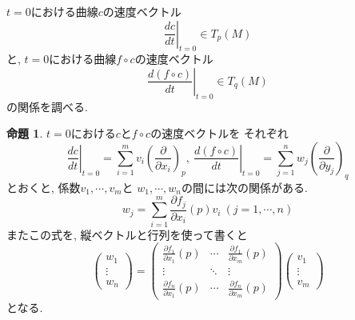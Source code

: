 \documentclass[a4j,12pt]{jarticle}
\theoremstyle{definition}
\newtheorem{proposition}[theorem]{命題}
\begin{document}
$t=0$における曲線$c$の速度ベクトル
$$\left .\frac{dc}{dt}\right|_{t=0}\in T_p(M)$$
と, $t=0$における曲線$f\circ c$の速度ベクトル
$$\left .\frac{d(f\circ c)}{dt}\right|_{t=0}
\in T_q(M)$$
の関係を調べる. 
\begin{proposition}\label{prop:relation of v and w}
    $t=0$における$c$と$f\circ c$の速度ベクトルを
    それぞれ
    $$\left .\frac{dc}{dt}\right|_{t=0}=
    \sum_{i=1}^{m}v_i\left(\frac{\partial}
    {\partial x_i}\right)_p,\ 
    \left .\frac{d(f\circ c)}{dt}\right|_{t=0}=
    \sum_{j=1}^{n}w_j\left(\frac{\partial}
    {\partial y_j}\right)_q$$
    とおくと, 係数$v_1,\cdots ,v_m$と
    $w_1,\cdots ,w_n$の間には次の関係がある. 
    $$w_j=\sum_{i=1}^{m}\frac{\partial f_j}
    {\partial x_i}(p)v_i\ (j=1,\cdots ,n)$$
    またこの式を, 縦ベクトルと行列を使って書くと
    $$\begin{pmatrix}
          w_1 \\
          \vdots \\
          w_n 
        \end{pmatrix}
        =
        \left(
        \begin{array}{ccc}
          \frac{\partial f_1}{\partial x_1}(p)&\cdots &\frac{\partial f_1}{\partial x_m}(p)\\
          \vdots &\ddots& \vdots \\
          \frac{\partial f_n}{\partial x_1}(p)&\cdots &\frac{\partial f_n}{\partial x_m}(p) 
        \end{array} 
        \right)
        \begin{pmatrix}
          v_1\\
          \vdots \\
          v_m
        \end{pmatrix}
        $$
    となる. 
\end{proposition}
\end{document}
